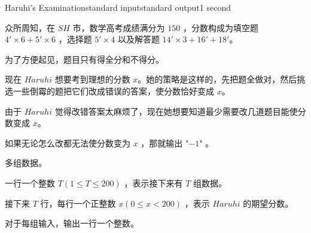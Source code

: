 \begin{problem}{Haruhi's Examination}{standard input}{standard output}{1 second}

众所周知，在 $SH$ 市，数学高考成绩满分为 $150$ ，分数构成为填空题 $4' \times 6 + 5' \times 6$ ，选择题 $5' \times 4$ 以及解答题 $14' \times 3 + 16' + 18'$。

为了方便起见，题目只有得全分和不得分。

现在 $Haruhi$ 想要考到理想的分数 $x$。她的策略是这样的，先把题全做对，然后挑选一些倒霉的题把它们改成错误的答案，使分数恰好变成 $x$。

由于 $Haruhi$ 觉得改错答案太麻烦了，现在她想要知道最少需要改几道题目能使分数变成 $x$。

如果无论怎么改都无法使分数变为 $x$ ，那就输出 "$-1$" 。

\InputFile

多组数据。

一行一个整数 $T (1 \leq T \leq 200)$ ，表示接下来有 $T$ 组数据。

接下来 $T$ 行，每行一个正整数 $x(0 \leq x \lt 200)$ ，表示 $Haruhi$ 的期望分数。

\OutputFile

对于每组输入，输出一行一个整数。

\Examples

\begin{example}
%
\end{example}
\end{problem}
